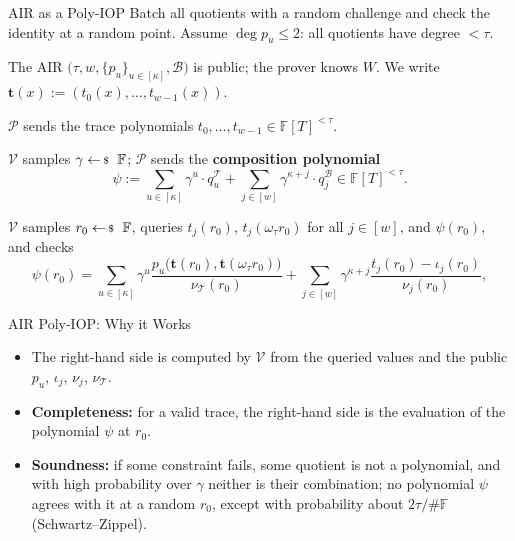 \documentclass{zkdl-presentation-template}
\begin{document}
    \begin{frame}{AIR as a Poly-IOP}
        Batch all quotients with a random challenge and check the identity at a random point. Assume $\deg p_u \leq 2$: all quotients have degree $< \tau$.
        \pause

        \begin{definition}
            \small
            The AIR $\big(\tau, w, \{p_u\}_{u \in [\kappa]}, \mathcal{B}\big)$ is public; the prover knows $W$. We write $\mathbf{t}(x) := (t_0(x), \ldots, t_{w-1}(x))$.
            \begin{algoen}
                \item<2-> $\mathcal{P}$ sends the trace polynomials $t_0, \ldots, t_{w-1} \in \mathbb{F}[T]^{<\tau}$.
                \item<3-> $\mathcal{V}$ samples $\gamma \leftarrowS \mathbb{F}$; $\mathcal{P}$ sends the \textbf{composition polynomial}
                \begin{equation*}
                    \psi := \sum_{u \in [\kappa]} \gamma^u \cdot q^{\mathcal{T}}_u + \sum_{j \in [w]} \gamma^{\kappa + j} \cdot q^{\mathcal{B}}_j \in \mathbb{F}[T]^{<\tau}.
                \end{equation*}
                \item<4-> $\mathcal{V}$ samples $r_0 \leftarrowS \mathbb{F}$, queries $t_j(r_0)$, $t_j(\omega_\tau r_0)$ for all $j \in [w]$, and $\psi(r_0)$, and checks
                \begin{equation*}
                    \psi(r_0) = \sum_{u \in [\kappa]} \gamma^u \frac{p_u\big(\mathbf{t}(r_0), \mathbf{t}(\omega_\tau r_0)\big)}{\nu_{\mathcal{T}}(r_0)} + \sum_{j \in [w]} \gamma^{\kappa + j} \frac{t_j(r_0) - \iota_j(r_0)}{\nu_j(r_0)},
                \end{equation*}
            \end{algoen}
        \end{definition}
    \end{frame}

    \begin{frame}{AIR Poly-IOP: Why it Works}
        \begin{itemize}
            \item The right-hand side is computed by $\mathcal{V}$ from the queried values and the public $p_u$, $\iota_j$, $\nu_j$, $\nu_{\mathcal{T}}$.\pause
            \item \textbf{Completeness:} for a valid trace, the right-hand side is the evaluation of the polynomial $\psi$ at $r_0$.\pause
            \item \textbf{Soundness:} if some constraint fails, some quotient is not a polynomial, and with high probability over $\gamma$ neither is their combination; no polynomial $\psi$ agrees with it at a random $r_0$, except with probability about $2\tau/\#\mathbb{F}$ (Schwartz--Zippel).
        \end{itemize}
    \end{frame}
\end{document}
